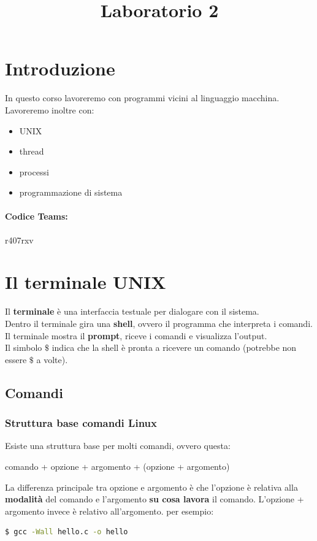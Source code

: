 \documentclass[12pt,a4paper]{article}
\title{Laboratorio 2}
\author{}
\date{}
\let\oldsection\section
\renewcommand{\section}{\clearpage\oldsection}
\begin{document}
\maketitle
\tableofcontents

\section{Introduzione}
In questo corso lavoreremo con programmi vicini al linguaggio macchina.\\
Lavoreremo inoltre con:
\begin{itemize}
    \item UNIX
    \item thread
    \item processi
    \item programmazione di sistema 
\end{itemize}
\paragraph{Codice Teams:} r407rxv

\section{Il terminale UNIX}
Il \textbf{terminale} è una interfaccia testuale per dialogare con il sistema.\\
Dentro il terminale gira una \textbf{shell}, ovvero il programma che interpreta i comandi.\\
Il terminale mostra il \textbf{prompt}, riceve i comandi e visualizza l'output.\\
Il simbolo $\$$ indica che la shell è pronta a ricevere un comando (potrebbe non essere $\$$ a volte).
\subsection{Comandi}
\subsubsection{Struttura base comandi Linux}
Esiste una struttura base per molti comandi, ovvero questa:
\begin{center}
    comando + opzione + argomento + (opzione + argomento)
\end{center}
La differenza principale tra opzione e argomento è che l'opzione è relativa alla \textbf{modalità} del comando e l'argomento \textbf{su cosa lavora} il comando. L'opzione + argomento invece è relativo all'argomento.
per esempio:
\begin{lstlisting}[language=bash]
    $ gcc -Wall hello.c -o hello
\end{lstlisting}
\end{document}

